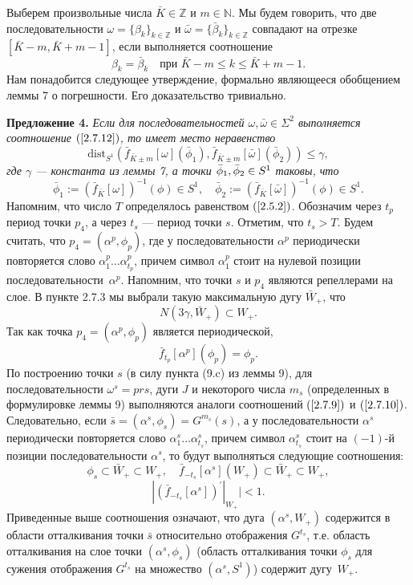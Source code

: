 \documentclass[12pt]{article}
\begin{document}
Выберем произвольные числа $\bar{K}\in\mathbb{Z}$ и $m\in\mathbb{N}$.
Мы будем говорить, что две последовательности $\omega=\{\beta_k\}_{k\in\mathbb{Z}}$ и $\bar{\omega}=\{\bar{\beta}_k\}_{k\in\mathbb{Z}}$ совпадают на отрезке $[\bar{K}-m,\bar{K}+m-1]$, если выполняется соотношение 
\begin{equation}
\label{2.7.12}
\beta_k=\bar{\beta}_k\quad\textrm{при }\bar{K}-m\leq k\leq \bar{K}+m-1.
\end{equation}
Нам понадобится следующее утверждение, формально являющееся обобщением леммы 7 о погрешности. Его доказательство тривиаль\nobreak но. 

\textbf{Предложение 4.}\textit{
Если для последовательностей $\omega,\bar{\omega}\in\Sigma^2$ выполняется соотношение $(\ref{2.7.12})$, то имеет место неравенство 
\begin{equation}
\label{2.7.13}
\mbox{dist}_{S^1}(\bar{f}_{\bar{K}\pm m}[\omega](\bar{\phi}_1),\bar{f}_{\bar{K}\pm m}[\bar{\omega}](\bar{\phi}_2))\leq\gamma,
\end{equation}
 где $\gamma$ --- константа из леммы 7, а точки $\bar{\phi}_1,\bar{\phi}_2\nobreak\in\nobreak S^1$ таковы, что 
\begin{equation}
\label{2.7.14}
\bar{\phi}_1:=(\bar{f}_{\bar{K}}[\omega])^{-1}(\phi)\in S^1,\quad\bar{\phi}_2:=(\bar{f}_{\bar{K}}[\bar{\omega}])^{-1}(\phi)\in S^1.
\end{equation}
}
Напомним, что число $T$ определялось равенством $(\ref{2.5.2})$.
Обозначим через $t_p$ период точки $p_4$, а через $t_s$ --- период точки $s$. Отметим, что $t_s>T$.
Будем считать, что $p_4=(\alpha^p,\phi_p)$, где у последовательности $\alpha^p$ периодически повторяется слово $\alpha^p_1\ldots\alpha^p_{t_p}$, причем символ $\alpha^p_1$ стоит на нулевой позиции последовательности~$\alpha^p$.  
Напомним, что точки $s$ и $p_4$ являются репеллерами на слое. В пункте 2.7.3 мы выбрали такую максимальную дугу $\bar{W}_+$, что
$$N(3\gamma,\bar{W}_+)\subset W_+.$$
Так как точка $p_4=(\alpha^p,\phi_p)$ является периодической,
$$\bar{f}_{t_p}[\alpha^p](\phi_p)=\phi_p.$$
По построению точки $s$ (в силу пункта (9.c) из леммы 9), для последовательности $\omega^s=pr s$, дуги $J$ и некоторого числа $m_s$ (определенных в формулировке леммы 9) выполняются аналоги соотношений $(\ref{2.7.9})$ и $(\ref{2.7.10})$.
Следовательно, если $\bar{s}=(\alpha^s,\phi_s)=G^{m_{s}}(s)$, а у последовательности $\alpha^s$ периодически повторяется слово $\alpha^s_1\ldots\alpha^s_{t_s}$, причем символ $\alpha^s_{t_s}$ стоит на $(-1)$-й позиции последовательности $\alpha^s$, то будут выполняться следующие соотношения: 
$$\phi_s\subset \bar{W}_+\subset W_+,\quad \bar{f}_{-t_s}[\alpha^s](W_+)\subset \bar{W}_+\subset W_+,$$
$$|(\bar{f}_{-t_s}[\alpha^s])^{\prime}|_{W_+}|<1.$$
Приведенные выше соотношения означают, что дуга $(\alpha^s,W_+)$ содержится в области отталкивания точки $\bar{s}$ относительно отображения $G^{t_s}$, т.е. область отталкивания на слое точки $(\alpha^s,\phi_s)$ (область отталкивания точки $\phi_s$ для сужения отображения $G^{t_s}$ на множество $(\alpha^s,S^1)$) содержит дугу~$W_+$.
\end{document}

